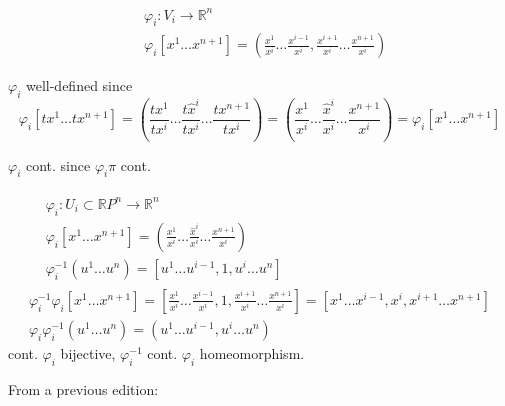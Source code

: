 \[
\begin{aligned}
   & \varphi_i : V_i \to \mathbb{R}^n \\ 
& \varphi_i [ x^1 \dots x^{n+1} ] = \left( \frac{ x^1 }{ x^i } \dots \frac{ x^{i-1}}{ x^i } , \frac{ x^{i+1}}{ x^i} \dots \frac{x^{n+1}}{ x^i} \right)
\end{aligned}
\]

$\varphi_i$ well-defined since 
\[
\varphi_i[tx^1 \dots tx^{n+1}] = \left( \frac{ tx^1 }{ tx^i } \dots \frac{ t\widehat{x}^i }{ tx^i } \dots \frac{ tx^{n+1}}{ tx^i } \right)= \left( \frac{x^1}{ x^i } \dots \frac{ \widehat{x}^i }{ x^i } \dots \frac{ x^{n+1}}{ x^i } \right) = \varphi_i[x^1 \dots x^{n+1} ]
\]

$\varphi_i$ cont. since $\varphi_i \pi$ cont.  



\[
\begin{gathered}
  \begin{aligned}
    & \varphi_i : U_i \subset \mathbb{R}P^n \to \mathbb{R}^n \\ 
    & \varphi_i[x^1 \dots x^{n+1} ] = \left( \frac{x^1}{x^i} \dots \frac{ \widehat{x}^i }{ x^i } \dots \frac{x^{n+1}}{ x^i } \right) \\
    & \varphi^{-1}_i(u^1 \dots u^n) = [ u^1 \dots u^{i-1}, 1 , u^i \dots u^n ]
\end{aligned} \\ 
  \varphi_i^{-1} \varphi_i[x^1 \dots x^{n+1} ] = \left[ \frac{x^1 }{ x^i } \dots \frac{x^{i-1}}{ x^i } , 1 , \frac{x^{i+1}}{ x^i} \dots \frac{x^{n+1}}{ x^i } \right] = [x^1 \dots x^{i-1}, x^i , x^{i+1} \dots x^{n+1} ] \\
  \varphi_i \varphi^{-1}_i(u^1 \dots u^n) = (u^1 \dots u^{i-1} , u^i  \dots u^n )
\end{gathered}
\]
cont. $\varphi_i$ bijective, $\varphi_i^{-1}$ cont. $\varphi_i$ homeomorphism.  

From a previous edition: 



